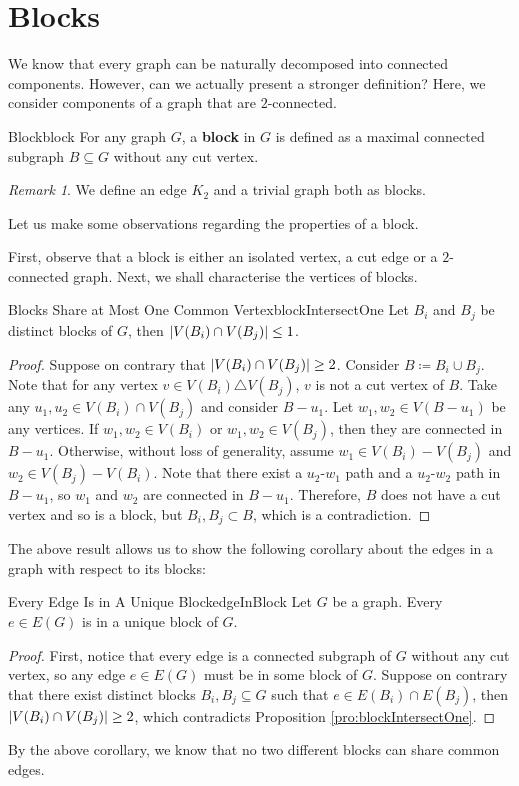\documentclass[math, code]{amznotes}
\theoremstyle{remark}
\newtheorem*{remark}{Remark}
\begin{document}
\section{Blocks}
We know that every graph can be naturally decomposed into connected components. However, can we actually present a stronger definition? Here, we consider components of a graph that are $2$-connected.
\begin{dfnbox}{Block}{block}
    For any graph $G$, a {\color{red} \textbf{block}} in $G$ is defined as a maximal connected subgraph $B \subseteq G$ without any cut vertex.
\end{dfnbox}
\begin{notebox}
    \begin{remark}
        We define an edge $K_2$ and a trivial graph both as blocks.
    \end{remark}
\end{notebox}
Let us make some observations regarding the properties of a block.

First, observe that a block is either an isolated vertex, a cut edge or a $2$-connected graph. Next, we shall characterise the vertices of blocks.
\begin{probox}{Blocks Share at Most One Common Vertex}{blockIntersectOne}
    Let $B_i$ and $B_j$ be distinct blocks of $G$, then ${\left\lvert {V(B_i) \cap V(B_j)} \right\rvert} \leq 1$.
    \tcblower
    \begin{proof}
        Suppose on contrary that ${\left\lvert {V(B_i) \cap V(B_j)} \right\rvert} \geq 2$. Consider $B \coloneqq B_i \cup B_j$. Note that for any vertex $v \in V(B_i) \triangle V(B_j)$, $v$ is not a cut vertex of $B$. Take any $u_1, u_2 \in V(B_i) \cap V(B_j)$ and consider $B - u_1$. Let $w_1, w_2 \in V(B - u_1)$ be any vertices. If $w_1, w_2 \in V(B_i)$ or $w_1, w_2 \in V(B_j)$, then they are connected in $B - u_1$. Otherwise, without loss of generality, assume $w_1 \in V(B_i) - V(B_j)$ and $w_2 \in V(B_j) - V(B_i)$. Note that there exist a $u_2$-$w_1$ path and a $u_2$-$w_2$ path in $B - u_1$, so $w_1$ and $w_2$ are connected in $B - u_1$. Therefore, $B$ does not have a cut vertex and so is a block, but $B_i, B_j \subset B$, which is a contradiction.
    \end{proof}
\end{probox}
The above result allows us to show the following corollary about the edges in a graph with respect to its blocks:
\begin{corbox}{Every Edge Is in A Unique Block}{edgeInBlock}
    Let $G$ be a graph. Every $e \in E(G)$ is in a unique block of $G$.
    \tcblower
    \begin{proof}
        First, notice that every edge is a connected subgraph of $G$ without any cut vertex, so any edge $e \in E(G)$ must be in some block of $G$. Suppose on contrary that there exist distinct blocks $B_i, B_j \subseteq G$ such that $e \in E(B_i) \cap E(B_j)$, then ${\left\lvert {V(B_i) \cap V(B_j)} \right\rvert} \geq 2$, which contradicts Proposition \ref{pro:blockIntersectOne}.
    \end{proof}
\end{corbox}
By the above corollary, we know that no two different blocks can share common edges.
\end{document}
